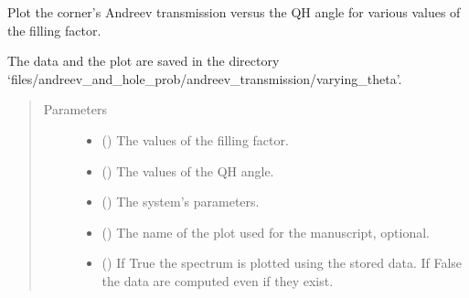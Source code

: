 \documentclass[letterpaper,10pt,english]{sphinxmanual}
\begin{document}
\begin{fulllineitems}
\label{\detokenize{modules:modules.utils.plot_tau_vs_theta_qh_various_fillings}}
\pysigstartsignatures
{}
\pysigstopsignatures
\sphinxAtStartPar
Plot the corner’s Andreev transmission versus the QH angle for various values of the filling factor.

\sphinxAtStartPar
The data and the plot are saved in the directory 
‘files/andreev\_and\_hole\_prob/andreev\_transmission/varying\_theta’.
\begin{quote}\begin{description}
\item[{Parameters}] \leavevmode\begin{itemize}
\item {} 
\sphinxAtStartPar
{} () \textendash{} The values of the filling factor.

\item {} 
\sphinxAtStartPar
{} () \textendash{} The values of the QH angle.

\item {} 
\sphinxAtStartPar
{} () \textendash{} The system’s parameters.

\item {} 
\sphinxAtStartPar
{} () \textendash{} The name of the plot used for the manuscript, optional.

\item {} 
\sphinxAtStartPar
{} () \textendash{} If True the spectrum is plotted using the stored data.
If False the data are computed even if they exist.

\end{itemize}

\end{description}\end{quote}

\end{fulllineitems}
\end{document}

